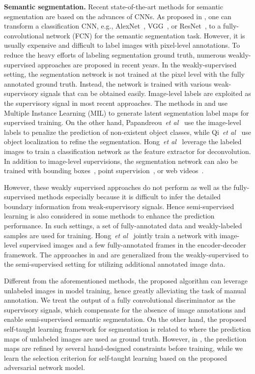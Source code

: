 \documentclass{bmvc2k}
\def\etal{\emph{et al}\bmvaOneDot}
\begin{document}
	
	{\flushleft \bf Semantic segmentation.}
	Recent state-of-the-art methods for semantic segmentation are based on the advances of CNNs. As proposed in \cite{fcn}, one can transform a classification CNN, e.g., AlexNet~\cite{alexnet}, VGG~\cite{vgg}, or ResNet~\cite{resnet}, to a fully-convolutional network (FCN) for the semantic segmentation task. 
	However, it is usually expensive and difficult to label images with pixel-level annotations. 
	To reduce the heavy efforts of labeling segmentation ground truth, numerous weakly-supervised approaches are proposed in recent years.
	In the weakly-supervised setting, the segmentation network is not trained at the pixel level with the fully annotated ground truth. Instead, the network is trained with various weak-supervisory signals that can be obtained easily.
	Image-level labels are exploited as the supervisory signal in most recent approaches.
	The methods in \cite{pinheiro2015weakly} and \cite{pathak2014fully} use Multiple Instance Learning (MIL) to generate latent segmentation label maps for supervised training.
	On the other hand, Papandreou~\etal~\cite{papandreou2015weakly} use the image-level labels to penalize the prediction of non-existent object classes, while Qi~\etal~\cite{qi2016augmented} use object localization to refine the segmentation. 
	Hong~\etal~\cite{hong2015decoupled} leverage the labeled images to train a classification network as the feature extractor for deconvolution.
	In addition to image-level supervisions, the segmentation network can also be trained with bounding boxes~\cite{dai2015boxsup, khoreva_CVPR17}, point supervision~\cite{bearman2016s}, or web videos~\cite{hong2017weakly}.
	
	
	However, these weakly supervised approaches do not perform as well as the fully-supervised methods especially because it is difficult to infer the detailed boundary information 
	from weak-supervisory signals.
	Hence semi-supervised learning is also considered in some methods to enhance the prediction performance.
	In such settings, a set of fully-annotated data and weakly-labeled samples 
	are used for training.
	Hong~\etal~\cite{hong2015decoupled} jointly train a network with image-level supervised images and  a few fully-annotated frames in the encoder-decoder framework. 
	The approaches in \cite{dai2015boxsup} and \cite{papandreou2015weakly} are generalized from the weakly-supervised to the semi-supervised setting for utilizing additional annotated image data.
	
	Different from the aforementioned methods, the proposed algorithm can leverage unlabeled images in model training, hence greatly alleviating the task of manual annotation.
	We treat the output of a fully convolutional discriminator as the supervisory signals, which compensate for the absence of image annotations and enable semi-supervised semantic segmentation.
	On the other hand, the proposed self-taught learning framework for segmentation is related to \cite{pathak2015constrained} where the prediction maps of unlabeled images are used as ground truth.
	However, in \cite{pathak2015constrained}, the prediction maps are refined by several hand-designed constraints before training, while we learn the selection criterion for self-taught learning based on the proposed adversarial network model. 
	
\end{document}
